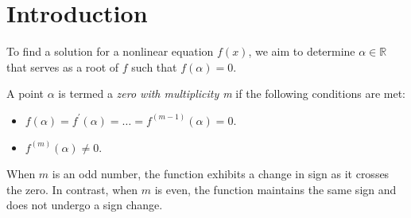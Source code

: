 \section{Introduction}

To find a solution for a nonlinear equation $f(x)$, we aim to determine $\alpha \in \mathbb{R}$ that serves as a root of $f$ such that $f(\alpha)=0$.
\begin{definition}
    A point $\alpha$  is termed a \emph{zero with multiplicity m} if the following conditions are met:
    \begin{itemize}
        \item $f(\alpha)=f^{'}(\alpha)=\dots=f^{\left(m-1\right)}(\alpha)=0$.
        \item $f^{\left(m\right)}(\alpha) \neq 0$.
    \end{itemize}
\end{definition}
When $m$ is an odd number, the function exhibits a change in sign as it crosses the zero. 
In contrast, when $m$ is even, the function maintains the same sign and does not undergo a sign change.